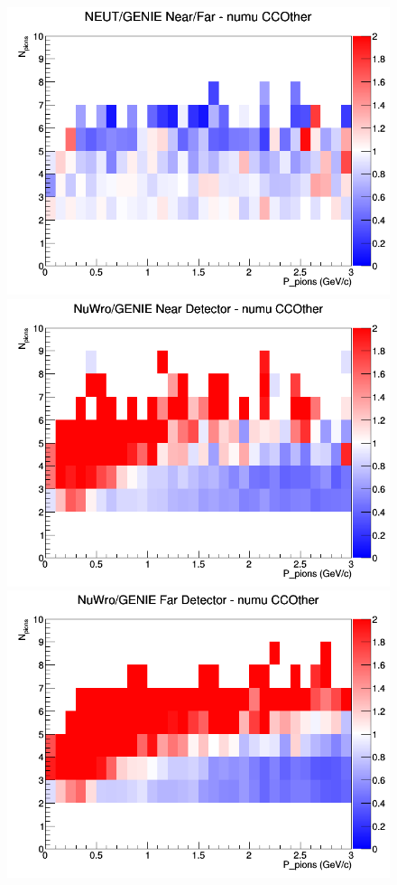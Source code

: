 \documentclass[12pt]{article}
\begin{document}
\begin{figure}[h]
\endminipage
{}
\includegraphics[width=\linewidth]{N_P/nominal/pions/ratios/CCOther_NEUT_GENIE_numu_NF_N_P.png}
\endminipage
\newline
{}
\includegraphics[width=\linewidth]{N_P/nominal/pions/ratios/CCOther_NuWro_GENIE_numu_near_N_P.png}
\endminipage
{}
\includegraphics[width=\linewidth]{N_P/nominal/pions/ratios/CCOther_NuWro_GENIE_numu_far_N_P.png}

\end{figure}
\end{document}

